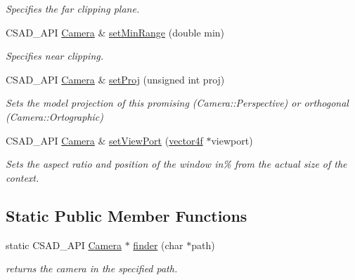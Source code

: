 \begin{DoxyCompactItemize}
\begin{DoxyCompactList}\small\item\em Specifies the far clipping plane. \end{DoxyCompactList}\item 
\hypertarget{classcsad_1_1_camera_a2c8267221b07ae03a670c69121ca090c}{C\-S\-A\-D\-\_\-\-A\-P\-I \hyperlink{classcsad_1_1_camera}{Camera} \& \hyperlink{classcsad_1_1_camera_a2c8267221b07ae03a670c69121ca090c}{set\-Min\-Range} (double min)}\label{classcsad_1_1_camera_a2c8267221b07ae03a670c69121ca090c}

\begin{DoxyCompactList}\small\item\em Specifies near clipping. \end{DoxyCompactList}\item 
\hypertarget{classcsad_1_1_camera_ab2ea58997abbbd2b394397227c101595}{C\-S\-A\-D\-\_\-\-A\-P\-I \hyperlink{classcsad_1_1_camera}{Camera} \& \hyperlink{classcsad_1_1_camera_ab2ea58997abbbd2b394397227c101595}{set\-Proj} (unsigned int proj)}\label{classcsad_1_1_camera_ab2ea58997abbbd2b394397227c101595}

\begin{DoxyCompactList}\small\item\em Sets the model projection of this promising (Camera\-::\-Perspective) or orthogonal (Camera\-::\-Ortographic) \end{DoxyCompactList}\item 
\hypertarget{classcsad_1_1_camera_aa5f97dd128f03939dfe3f57ced8bd749}{C\-S\-A\-D\-\_\-\-A\-P\-I \hyperlink{classcsad_1_1_camera}{Camera} \& \hyperlink{classcsad_1_1_camera_aa5f97dd128f03939dfe3f57ced8bd749}{set\-View\-Port} (\hyperlink{classbt_1_1vector4f}{vector4f} $\ast$viewport)}\label{classcsad_1_1_camera_aa5f97dd128f03939dfe3f57ced8bd749}

\begin{DoxyCompactList}\small\item\em Sets the aspect ratio and position of the window in\% from the actual size of the context. \end{DoxyCompactList}\end{DoxyCompactItemize}
\subsection*{Static Public Member Functions}
\begin{DoxyCompactItemize}
\item 
\hypertarget{classcsad_1_1_camera_ae5b4cbfae3b97dd1aa3ba315c5a13f2a}{static C\-S\-A\-D\-\_\-\-A\-P\-I \hyperlink{classcsad_1_1_camera}{Camera} $\ast$ \hyperlink{classcsad_1_1_camera_ae5b4cbfae3b97dd1aa3ba315c5a13f2a}{finder} (char $\ast$path)}\label{classcsad_1_1_camera_ae5b4cbfae3b97dd1aa3ba315c5a13f2a}

\begin{DoxyCompactList}\small\item\em returns the camera in the specified path. \end{DoxyCompactList}\end{DoxyCompactItemize}
